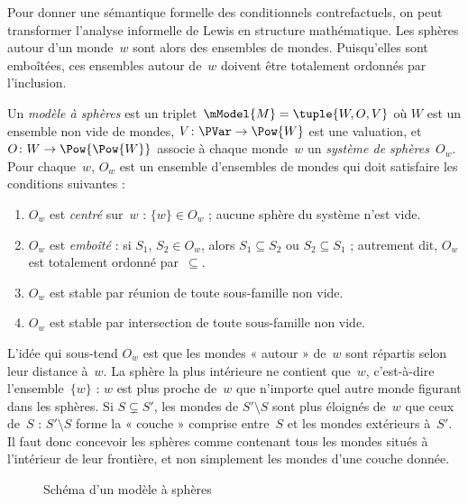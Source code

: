 \documentclass[../../../include/open-logic-section]{subfiles}
\begin{document}


Pour donner une sémantique formelle des conditionnels contrefactuels,
on peut transformer l'analyse informelle de Lewis en structure
mathématique. Les sphères autour d'un monde~$w$ sont alors des
ensembles de mondes. Puisqu'elles sont emboîtées, ces ensembles
autour de~$w$ doivent être totalement ordonnés par l'inclusion.

\begin{defn}
  Un \emph{modèle à sphères} est un triplet~$\mModel{M} = \tuple{W, O, V}$
  où $W$ est un ensemble non vide de mondes, $V\colon \PVar \to \Pow{W}$
  est une valuation, et $O\colon W \to \Pow{\Pow{W}}$ associe à chaque
  monde~$w$ un \emph{système de sphères}~$O_w$. Pour chaque~$w$,
  $O_w$ est un ensemble d'ensembles de mondes qui doit satisfaire les
  conditions suivantes :
  \begin{enumerate}
  \item $O_w$ est \emph{centré} sur~$w$ : $\{w\} \in O_w$ ; aucune
    sphère du système n'est vide.
  \item $O_w$ est \emph{emboîté} : si $S_1$, $S_2 \in O_w$, alors $S_1
    \subseteq S_2$ ou $S_2 \subseteq S_1$ ; autrement dit, $O_w$ est
    totalement ordonné par~$\subseteq$.
  \item $O_w$ est stable par réunion de toute sous-famille non vide.
  \item $O_w$ est stable par intersection de toute sous-famille non vide.
  \end{enumerate}
\end{defn}

L'idée qui sous-tend $O_w$ est que les mondes « autour » de~$w$ sont
répartis selon leur distance à~$w$. La sphère la plus intérieure ne
contient que~$w$, c'est-à-dire l'ensemble~$\{w\}$ : $w$ est plus proche
de~$w$ que n'importe quel autre monde figurant dans les sphères. Si
$S \subsetneq S'$,
les mondes de $S' \setminus S$ sont plus éloignés de~$w$ que ceux de~$S$ :
$S' \setminus S$ forme la « couche » comprise entre~$S$ et les mondes
extérieurs à~$S'$. Il faut donc concevoir les sphères comme contenant
tous les mondes situés à l'intérieur de leur frontière, et non
simplement les mondes d'une couche donnée.

\begin{figure}
\begin{center}
\caption{Schéma d'un modèle à sphères}
\end{center}
\end{figure}
\end{document}
